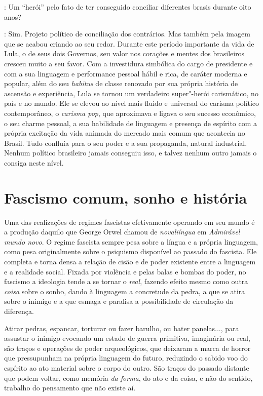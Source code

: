 \smallskip

\noindent{}: Um ``herói'' pelo fato de ter conseguido conciliar diferentes brasis
durante oito anos?

\noindent{}: Sim. Projeto político de conciliação dos contrários. Mas também pela
imagem que se acabou criando ao seu redor. Durante este período
importante da vida de Lula, o de seus dois Governos, seu valor nos
corações e mentes dos brasileiros cresceu muito a seu favor. Com a
investidura simbólica do cargo de presidente e com a sua linguagem e
performance pessoal hábil e rica, de caráter moderna e popular, além do
seu \emph{habitus} de classe renovado por sua própria história de
ascensão e experiência, Lula se tornou um verdadeiro super"-herói
carismático, no país e no mundo. Ele se elevou ao nível mais fluido e
universal do carisma político contemporâneo, o \emph{carisma pop}, que
aproximava e ligava o seu sucesso econômico, o seu charme pessoal, a sua
habilidade de linguagem e presença de espírito com a própria excitação
da vida animada do mercado mais comum que acontecia no Brasil. Tudo
confluía para o seu poder e a sua propaganda, natural industrial. Nenhum
político brasileiro jamais conseguiu isso, e talvez nenhum outro jamais
o consiga neste nível.

\chapter{Fascismo comum, sonho e história}

Uma das realizações de regimes fascistas efetivamente operando em seu
mundo é a produção daquilo que George Orwel chamou de \emph{novaliíngua}
em \emph{Admirável mundo novo}. O regime fascista sempre pesa sobre a
língua e a própria linguagem, como pesa originalmente sobre o psiquismo
disponível ao passado do fascista. Ele completa e torna densa a relação
de cisão e de poder existente entre a linguagem e a realidade social.
Fixada por violência e pelas balas e bombas do poder, no fascismo a
ideologia tende a se tornar o \emph{real}, fazendo efeito mesmo como
outra \emph{coisa} sobre o sonho, dando à linguagem a concretude da
pedra, a que se atira sobre o inimigo e a que esmaga e paralisa a
possibilidade de circulação da diferença.

Atirar pedras, espancar, torturar ou fazer barulho, ou bater panelas...,
para assustar o inimigo evocando um estado de guerra primitiva,
imaginária ou real, são traços e operações de poder arqueológicos, que
deixaram a marca de horror que pressupunham na própria linguagem do
futuro, reduzindo o sabido voo do espírito ao ato material sobre o corpo
do outro. São traços do passado distante que podem voltar, como memória
\emph{da forma}, do ato e da coisa, e não do sentido, trabalho do
pensamento que não existe aí.

